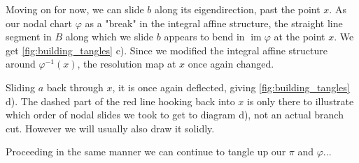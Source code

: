 \documentclass[12pt,a4paper,abstract=true,draft]{scrartcl}
\DeclareMathOperator{\im}{im}
\begin{document}
\begin{example}
  Moving on for now, we can slide $b$ along its eigendirection, past the point $x$.
  As our nodal chart $φ$ as a "break" in the integral affine structure, the straight line segment in $B$ along which we slide $b$ appears to bend in $\im φ$ at the point $x$.
  We get \cref{fig:building_tangles} c).
  Since we modified the integral affine structure around $φ^{-1}(x)$, the resolution map at $x$ once again changed.

  Sliding $a$ back through $x$, it is once again deflected, giving \cref{fig:building_tangles} d).
  The dashed part of the red line hooking back into $x$ is only there to illustrate which order of nodal slides we took to get to diagram d), not an actual branch cut.
  However we will usually also draw it solidly.
  
  Proceeding in the same manner we can continue to tangle up our $π$ and $φ$...
\end{example}
\end{document}
